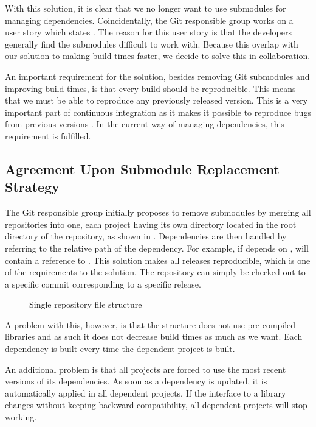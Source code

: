 With this solution, it is clear that we no longer want to use submodules for managing dependencies. Coincidentally, the Git responsible group works on a user story which states . The reason for this user story is that the developers generally find the submodules difficult to work with. Because this overlap with our solution to making build times faster, we decide to solve this in collaboration.

An important requirement for the solution, besides removing Git submodules and improving build times, is that every build should be reproducible. This means that we must be able to reproduce any previously released version. This is a very important part of continuous integration as it makes it possible to reproduce bugs from previous versions \parencite{fowlerReproducibleBuild,humble2010}. In the current way of managing dependencies, this requirement is fulfilled.

\subsection{Agreement Upon Submodule Replacement Strategy}
The Git responsible group initially proposes to remove submodules by merging all repositories into one, each project having its own directory located in the root directory of the repository, as shown in . Dependencies are then handled by referring to the relative path of the dependency. For example, if  depends on ,  will contain a reference to . This solution makes all releases reproducible, which is one of the requirements to the solution. The repository can simply be checked out to a specific commit corresponding to a specific release.
\begin{figure}
\caption{Single repository file structure} \label{fig:single_repo_structure}
\end{figure}
A problem with this, however, is that the structure does not use pre-compiled libraries and as such it does not decrease build times as much as we want. Each dependency is built every time the dependent project is built.

An additional problem is that all projects are forced to use the most recent versions of its dependencies. As soon as a dependency is updated, it is automatically applied in all dependent projects. If the interface to a library changes without keeping backward compatibility, all dependent projects will stop working.

